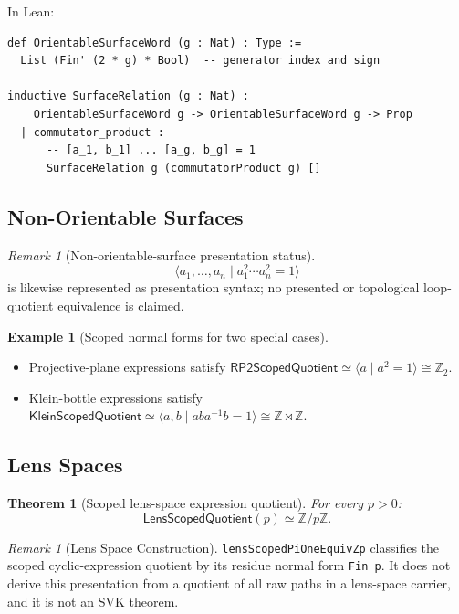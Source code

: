 \documentclass{lmcs}
\theoremstyle{definition}
\newtheorem{example}[definition]{Example}
\theoremstyle{plain}
\newtheorem{theorem}[definition]{Theorem}
\theoremstyle{remark}
\newtheorem{remark}[definition]{Remark}
\newcommand{\ZZ}{\mathbb{Z}}
\begin{document}
In Lean:
\begin{lstlisting}
def OrientableSurfaceWord (g : Nat) : Type :=
  List (Fin' (2 * g) * Bool)  -- generator index and sign

inductive SurfaceRelation (g : Nat) :
    OrientableSurfaceWord g -> OrientableSurfaceWord g -> Prop
  | commutator_product :
      -- [a_1, b_1] ... [a_g, b_g] = 1
      SurfaceRelation g (commutatorProduct g) []
\end{lstlisting}

\subsection{Non-Orientable Surfaces}

\begin{remark}[Non-orientable-surface presentation status]
\[
\langle a_1,\ldots,a_n\mid a_1^2\cdots a_n^2=1\rangle
\]
is likewise represented as presentation syntax; no presented or topological
loop-quotient equivalence is claimed.
\end{remark}

\begin{example}[Scoped normal forms for two special cases]
\leavevmode
\begin{itemize}
    \item Projective-plane expressions satisfy
      \(\mathsf{RP2ScopedQuotient}\simeq\langle a\mid a^2=1\rangle\cong\ZZ_2\).
    \item Klein-bottle expressions satisfy
      \(\mathsf{KleinScopedQuotient}\simeq
       \langle a,b\mid aba^{-1}b=1\rangle\cong\ZZ\rtimes\ZZ\).
\end{itemize}
\end{example}

\subsection{Lens Spaces}

\begin{theorem}[Scoped lens-space expression quotient]
For every $p>0$:
\[
\mathsf{LensScopedQuotient}(p) \simeq \ZZ/p\ZZ.
\]
\end{theorem}

\begin{remark}[Lens Space Construction]
\texttt{lensScopedPiOneEquivZp} classifies the scoped cyclic-expression
quotient by its residue normal form \texttt{Fin p}.  It does not derive this
presentation from a quotient of all raw paths in a lens-space carrier, and it
is not an SVK theorem.
\end{remark}
\end{document}
